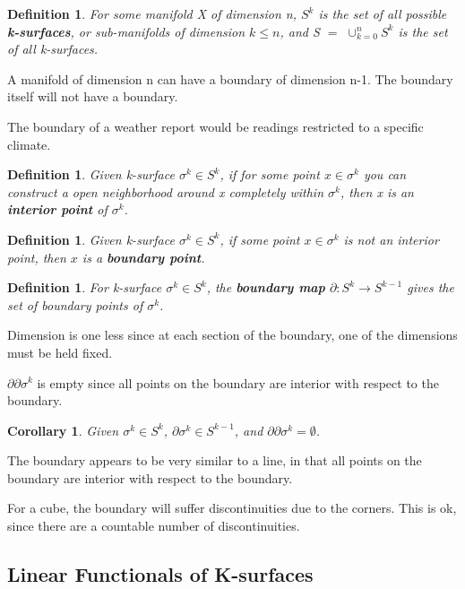 \documentclass{book}
\newtheorem{defn}[equation]{Definition}
\newtheorem{coro}[equation]{Corollary}
\begin{document}
\begin{defn}
	For some manifold X of dimension n, $S^k$ is the set of all possible \textbf{k-surfaces}, or sub-manifolds of dimension $k \leq n$, and S $=$ $\cup^n_{k=0}S^k$ is the set of all k-surfaces. 
\end{defn}

A manifold of dimension n can have a boundary of dimension n-1. The boundary itself will not have a boundary.

The boundary of a weather report would be readings restricted to a specific climate. 


\begin{defn}
	Given k-surface $\sigma^k \in S^k$, if for some point $x \in \sigma^k$ you can construct a open neighborhood around x completely within $\sigma^k$, then x is an \textbf{interior point} of $\sigma^k$. 
\end{defn}

\begin{defn}
	Given k-surface $\sigma^k \in S^k$, if some point $x \in \sigma^k$ is not an interior point, then $x$ is a \textbf{boundary point}.
\end{defn}



\begin{defn}
	For k-surface $\sigma^k \in S^k$, the \textbf{boundary map} $\partial : S^k \to S^{k-1}$ gives the set of boundary points of $\sigma^k$. 
\end{defn}


Dimension is one less since at each section of the boundary, one of the dimensions must be held fixed.

$\partial\partial \sigma^k$ is empty since all points on the boundary are interior with respect to the boundary.


\begin{coro}
	Given $\sigma^k \in S^k$, $\partial \sigma^k \in S^{k-1}$, and $\partial\partial \sigma^k = \emptyset$. 
\end{coro}


The boundary appears to be very similar to a line, in that all points on the boundary are interior with respect to the boundary. 

For a cube, the boundary will suffer discontinuities due to the corners. This is ok, since there are a countable number of discontinuities. 

\subsection{Linear Functionals of K-surfaces}
\end{document}
